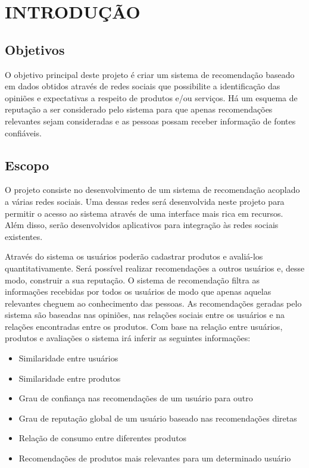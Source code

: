 \chapter{INTRODUÇÃO} 

\section{Objetivos} %

 O objetivo principal deste projeto é criar um sistema de recomendação baseado em dados obtidos através de redes sociais que possibilite a identificação das opiniões e expectativas a respeito de produtos e/ou serviços. Há um esquema de reputação a ser considerado pelo sistema para que apenas recomendações relevantes sejam consideradas e as pessoas possam receber informação de fontes confiáveis.

\section{Escopo}

 O projeto consiste no desenvolvimento de um sistema de recomendação acoplado a várias redes sociais. Uma dessas redes será desenvolvida neste projeto para permitir o acesso ao sistema através de uma interface mais rica em recursos. Além disso, serão desenvolvidos aplicativos para integração às redes sociais existentes.

 Através do sistema os usuários poderão cadastrar produtos e avaliá-los quantitativamente. Será possível realizar recomendações a outros usuários e, desse modo, construir a sua reputação. O sistema de recomendação filtra as informações recebidas por todos os usuários de modo que apenas aquelas relevantes cheguem ao conhecimento das pessoas. As recomendações geradas pelo sistema são baseadas nas opiniões, nas relações sociais entre os usuários e na relações encontradas entre os produtos. Com base na relação entre usuários, produtos e avaliações o sistema irá inferir as seguintes informações:
\begin{itemize}

 \item Similaridade entre usuários

 \item Similaridade entre produtos

 \item Grau de confiança nas recomendações de um usuário para outro

 \item Grau de reputação global de um usuário baseado nas recomendações diretas

 \item Relação de consumo entre diferentes produtos

 \item Recomendações de produtos mais relevantes para um determinado usuário

\end{itemize}

